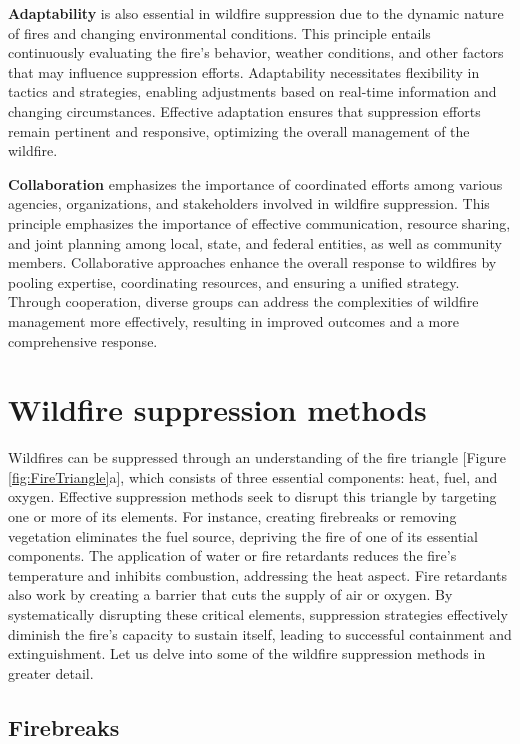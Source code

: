 \documentclass[
  12 pt,
]{Nemilov}
\begin{document}
\textbf{Adaptability} is also essential in wildfire suppression due to the dynamic nature of fires and changing environmental conditions. This principle entails continuously evaluating the fire's behavior, weather conditions, and other factors that may influence suppression efforts. Adaptability necessitates flexibility in tactics and strategies, enabling adjustments based on real-time information and changing circumstances. Effective adaptation ensures that suppression efforts remain pertinent and responsive, optimizing the overall management of the wildfire.

\textbf{Collaboration} emphasizes the importance of coordinated efforts among various agencies, organizations, and stakeholders involved in wildfire suppression. This principle emphasizes the importance of effective communication, resource sharing, and joint planning among local, state, and federal entities, as well as community members. Collaborative approaches enhance the overall response to wildfires by pooling expertise, coordinating resources, and ensuring a unified strategy. Through cooperation, diverse groups can address the complexities of wildfire management more effectively, resulting in improved outcomes and a more comprehensive response.

\section{Wildfire suppression methods}\label{wildfire-suppression-methods}

Wildfires can be suppressed through an understanding of the fire triangle {[}Figure \ref{fig:FireTriangle}a{]}, which consists of three essential components: heat, fuel, and oxygen. Effective suppression methods seek to disrupt this triangle by targeting one or more of its elements. For instance, creating firebreaks or removing vegetation eliminates the fuel source, depriving the fire of one of its essential components. The application of water or fire retardants reduces the fire's temperature and inhibits combustion, addressing the heat aspect. Fire retardants also work by creating a barrier that cuts the supply of air or oxygen. By systematically disrupting these critical elements, suppression strategies effectively diminish the fire's capacity to sustain itself, leading to successful containment and extinguishment. Let us delve into some of the wildfire suppression methods in greater detail.

\subsection{Firebreaks}\label{firebreaks}
\end{document}
